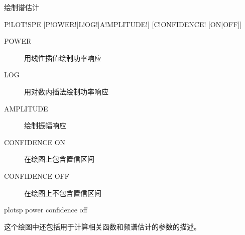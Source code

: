 \label{spe:plotspe}

绘制谱估计

\begin{SACSTX}
P!LOT!SPE [P!OWER!|L!OG!|A!MPLITUDE!] [C!ONFIDENCE! [ON|OFF]]
\end{SACSTX}

\begin{description}
\item [POWER] 用线性插值绘制功率响应
\item [LOG] 用对数内插法绘制功率响应
\item [AMPLITUDE] 绘制振幅响应
\item [CONFIDENCE ON] 在绘图上包含置信区间
\item [CONFIDENCE OFF] 在绘图上不包含置信区间
\end{description}

\begin{SACDFT}
plotsp power confidence off
\end{SACDFT}

这个绘图中还包括用于计算相关函数和频谱估计的参数的描述。

